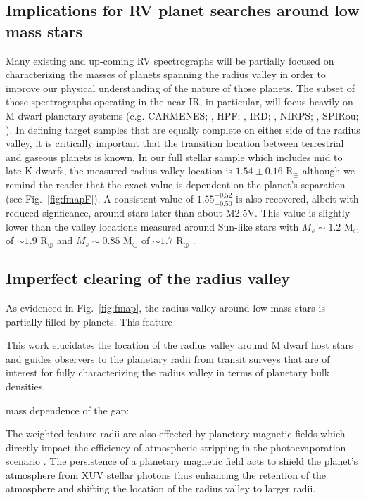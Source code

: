 \documentclass[twocolumn]{emulateapj}
\begin{document}
\subsection{Implications for RV planet searches around low mass stars}
Many existing and up-coming RV spectrographs
will be partially focused on characterizing the masses of planets spanning the radius valley in order to
improve our physical understanding of the nature of those planets. The subset of those spectrographs operating
in the near-IR, in particular, will focus heavily on M dwarf planetary systems
(e.g. CARMENES; \citealt{quirrenbach14}, HPF; \citealt{mahadevan12}, IRD; \citealt{kotani14},
NIRPS; \citealt{bouchy17}, SPIRou; \citealt{donati18}). In defining target samples
that are equally complete on either side of the radius valley, it is critically important that the transition
location between terrestrial and gaseous planets is known. In our full stellar sample which includes mid to
late K dwarfs, the measured radius valley location is $1.54\pm 0.16$ R$_{\oplus}$ although we remind the reader
that the exact value is dependent on the planet's separation (see Fig.~\ref{fig:fmapF}). A consistent value of
$1.55^{+0.52}_{-0.50}$ is also recovered, albeit with reduced signficance, around stars later than about M2.5V.
This value is slightly lower than the valley locations measured around Sun-like stars with $M_s \sim 1.2$
M$_{\odot}$ of $\sim 1.9$ R$_{\oplus}$ and  $M_s \sim 0.85$ M$_{\odot}$ of $\sim 1.7$ R$_{\oplus}$ \citep{fulton18}.

\subsection{Imperfect clearing of the radius valley} \label{sect:void}
As evidenced in Fig.~\ref{fig:fmap}, the radius valley around low mass stars is partially filled by planets.
This feature 

This work elucidates the location of
the radius valley around M dwarf host stars and guides observers to the planetary radii from transit surveys
that are of interest for fully characterizing the radius valley in terms of planetary bulk densities.

mass dependence of the gap: 

The weighted feature radii are also effected by planetary magnetic fields which directly impact the 
efficiency of atmospheric stripping in the photoevaporation scenario \citep{owen19}. The persistence 
of a planetary magnetic field acts to shield the planet's atmosphere from XUV stellar photons thus 
enhancing the retention of the atmosphere and shifting the location of the radius valley to larger 
radii.
\end{document}
